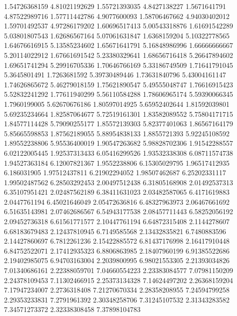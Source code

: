   1.54726368159    4.81021192629
  1.55721393035     4.8427138227
   1.5671641791    4.87522989716
  1.57711442786     4.9077600093
  1.58706467662    4.94030402012
  1.59701492537    4.97286179202
  1.60696517413    5.00543318876
  1.61691542289    5.03801807543
  1.62686567164    5.07061631847
   1.6368159204    5.10322778565
  1.64676616915    5.13585234602
  1.65671641791    5.16848986996
  1.66666666667    5.20114022912
  1.67661691542    5.23380329641
  1.68656716418    5.26647894602
  1.69651741294    5.29916705336
  1.70646766169    5.33186749509
  1.71641791045     5.3645801491
   1.7263681592    5.39730489446
  1.73631840796    5.43004161147
  1.74626865672    5.46279018159
  1.75621890547    5.49555048747
  1.76616915423    5.52832241292
  1.77611940299    5.56110584288
  1.78606965174    5.59390066345
   1.7960199005    5.62670676186
  1.80597014925    5.65952402644
  1.81592039801    5.69235234664
  1.82587064677    5.72519161301
  1.83582089552    5.75804171715
  1.84577114428    5.79090255177
  1.85572139303    5.82377401063
  1.86567164179    5.85665598853
  1.87562189055    5.88954838133
   1.8855721393    5.92245108592
  1.89552238806    5.95536400019
  1.90547263682    5.98828702306
  1.91542288557    6.02122005445
  1.92537313433    6.05416299526
  1.93532338308    6.08711574738
  1.94527363184    6.12007821367
   1.9552238806    6.15305029795
  1.96517412935      6.186031905
  1.97512437811    6.21902294052
  1.98507462687    6.25202331117
  1.99502487562    6.28503292453
  2.00497512438    6.31805168908
  2.01492537313    6.35107951421
  2.02487562189    6.38411631023
  2.03482587065     6.4171619883
   2.0447761194    6.45021646049
  2.05472636816    6.48327963973
  2.06467661692    6.51635143981
  2.07462686567    6.54943177538
  2.08457711443    6.58252056192
  2.09452736318    6.61561771577
  2.10447761194    6.64872315408
   2.1144278607    6.68183679483
  2.12437810945     6.7149585568
  2.13432835821     6.7480883596
  2.14427860697     6.7812261236
  2.15422885572    6.81437176998
  2.16417910448    6.84752522071
  2.17412935323     6.8806863985
  2.18407960199    6.91385522686
  2.19402985075    6.94703163004
   2.2039800995    6.98021553305
  2.21393034826    7.01340686161
  2.22388059701    7.04660554223
  2.23383084577    7.07981150209
  2.24378109453    7.11302466915
  2.25373134328    7.14624497202
  2.26368159204    7.17947234007
   2.2736318408    7.21270670334
  2.28358208955    7.24594799258
  2.29353233831     7.2791961392
  2.30348258706    7.31245107532
  2.31343283582    7.34571273372
  2.32338308458    7.37898104783
